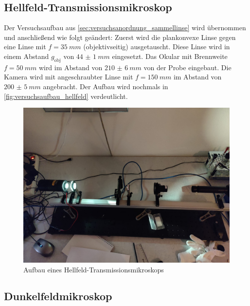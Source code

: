 \documentclass[ngerman]{scrartcl}
\begin{document}
\subsection{Hellfeld-Transmissionsmikroskop}
\label{subsec:versuchsanordnung_hellfeld}

Der Versuchsaufbau aus \autoref{sec:versuchsanordnung_sammellinse} wird übernommen und anschließend wie folgt geändert: Zuerst wird die plankonvexe Linse gegen eine Linse mit $f = \SI{35}{mm}$ (objektivseitig) ausgetauscht. Diese Linse wird in einem Abstand $g_{\text{obj}}$ von $\SI{44(1)}{mm}$ eingesetzt. Das Okular mit Brennweite $f = \SI{50}{mm}$ wird im Abstand von $\SI{210(6)}{mm}$ von der Probe eingebaut. Die Kamera wird mit angeschraubter Linse mit $f = \SI{150}{mm}$ im Abstand von $\SI{200(5)}{mm}$ angebracht. %
Der Aufbau wird nochmals in \autoref{fig:versuchsaufbau_hellfeld} verdeutlicht.
%
\begin{figure}[H]
    \centering
    \begin{samepage}
        \includegraphics[width=\linewidth]{fig/Hellfeld_.jpeg}
        \caption{Aufbau eines Hellfeld-Transmissionsmikroskops}
        \label{fig:versuchsaufbau_hellfeld}
    \end{samepage}
\end{figure}


\subsection{Dunkelfeldmikroskop}
\label{subsec:versuchsanordnung_dunkelfeld}
\end{document}
